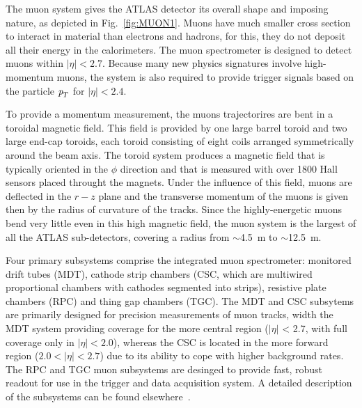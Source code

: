 The muon system gives the ATLAS detector its overall shape and imposing nature, as depicted in Fig.~\ref{fig:MUON1}.
Muons have much smaller cross section to interact in material than electrons and hadrons, for this, they 
do not deposit all their energy in the calorimeters. The muon spectrometer is designed to detect muons within $|\eta|<2.7$. Because many new physics signatures involve high-momentum muons, the system is also required to provide trigger signals based on the particle ${\emph{p}_{T}}$ for  $|\eta|<2.4$.

To provide a momentum measurement, the muons trajectorires are bent in a toroidal magnetic field. This field is provided by one large barrel toroid and two large end-cap toroids, each toroid consisting of eight coils arranged symmetrically around the beam axis.  The toroid system produces a magnetic field that is typically oriented in the $\phi$ direction and that is measured with over 1800 Hall sensors placed throught the magnets. Under the influence of this field, muons are deflected in the $r - z$ plane and the transverse momentum of the muons is given then by the radius of curvature of the tracks. Since the highly-energetic muons bend very little even in this high magnetic field, the muon system is the largest of all the ATLAS sub-detectors, covering a radius from $\sim$4.5~m to $\sim$12.5~m.

Four  primary subsystems comprise the integrated muon spectrometer: monitored drift tubes (MDT), cathode strip chambers (CSC, which are multiwired proportional chambers with cathodes segmented into strips), resistive plate chambers (RPC) and thing gap chambers (TGC). The MDT and CSC subsytems are primarily designed for precision measurements of muon tracks, width the MDT system providing coverage for the more central region ($|\eta|$ < 2.7, with full coverage only in $|\eta| < 2.0$), whereas the CSC is located in the more forward region ($2.0 < |\eta| < 2.7$) due to its ability to cope with higher background rates. The RPC and TGC muon subsystems are desinged to provide fast, robust readout for use in the trigger and data acquisition system.  A detailed description of the subsystems can be found elsewhere~\cite{ATLAS}. 




